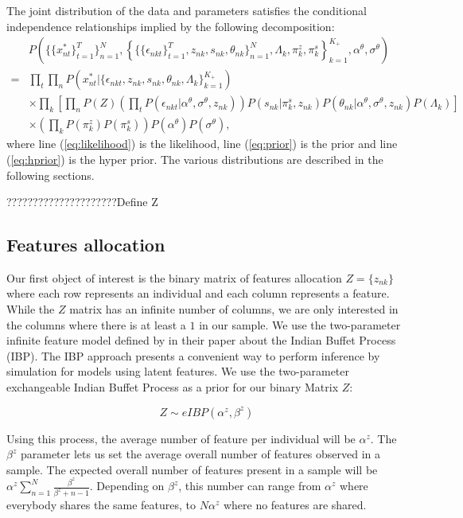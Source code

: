 \documentclass[12pt]{article}
\begin{document}
The joint distribution of the data and parameters satisfies the conditional independence relationships implied by the following decomposition:
\begin{align}
		& P\left( \{\{x_{nt}^*\}_{t=1}^T\}_{n=1}^N, \left\{ \{\{\epsilon_{nkt}\}_{t=1}^T, z_{nk},s_{nk}, \theta_{nk} \}_{n=1}^N, \Lambda_{k},\pi_k^z, \pi_k^s \right\}_{k=1}^{K_+},\alpha^\theta, \sigma^\theta \right) \\
	=	& \label{eq:likelihood} \prod_t \prod_{n} P\left(x_{nt}^*|\{\epsilon_{nkt},z_{nk},s_{nk}, \theta_{nk},\Lambda_{k}  \}_{k=1}^{K_+}\right) \\
		& \label{eq:prior} \times \prod_k \left[
			\prod_n 
				P(Z)
				\left( \prod_t P(\epsilon_{nkt}|\alpha^\theta,\sigma^\theta,z_{nk}) \right) 
				P(s_{nk}|\pi_k^s,z_{nk})
				P(\theta_{nk}|\alpha^\theta, \sigma^\theta, z_{nk})
				P(\Lambda_{k})
		\right] \\
		&  \label{eq:hprior}\times
		\left(\prod_k
			P(\pi_k^z)
			P(\pi_k^s)\right) 
		P(\alpha^\theta)
		P(\sigma^\theta),
\end{align}
where line (\ref{eq:likelihood}) is the likelihood, line (\ref{eq:prior}) is the prior and line (\ref{eq:hprior}) is the hyper prior. The various distributions are described in the following sections.

?????????????????????Define Z

\subsection{Features allocation}

Our first object of interest is the binary matrix of features allocation $Z=\{z_{nk}\}$ where each row represents an individual and each column represents a feature. While the $Z$ matrix has an infinite number of columns, we are only interested in the columns where there is at least a $1$ in our sample. We use the two-parameter infinite feature model defined by \cite{griffiths2011indian} in their paper about the Indian Buffet Process (IBP). The IBP approach presents a convenient way to perform inference by simulation for models using latent features. We use the two-parameter exchangeable Indian Buffet Process as a prior for our binary Matrix $Z$:

$$ Z \sim eIBP(\alpha^z,\beta^z) $$ 



Using this process, the average number of feature per individual will be $\alpha^z$. The $\beta^z$ parameter lets us set the average overall number of features observed in a sample. The expected overall number of features present in a sample will be $\alpha^z \sum_{n=1}^{N} \frac{\beta^z}{\beta^z + n - 1}$. Depending on $\beta^z$, this number can range from $\alpha^z$ where everybody shares the same features, to $N\alpha^z$ where no features are shared.
\end{document}
